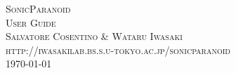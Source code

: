 \documentclass[12pt]{article} %
\begin{document}

\begin{titlepage}

\newcommand{\HRule}{\rule{\linewidth}{0.5mm}} %

\center %

\textsc{\LARGE SonicParanoid}\\[0.5cm] %
\textsc{\large User Guide}\\[0.5cm] %
\textsc{\large Salvatore Cosentino \& Wataru Iwasaki}\\[0.5cm] %
\textsc{\small http://iwasakilab.bs.s.u-tokyo.ac.jp/sonicparanoid}\\[1.0cm] %




{\large \today}\\[3cm] %


\vfill %

\end{titlepage}
\end{document}
